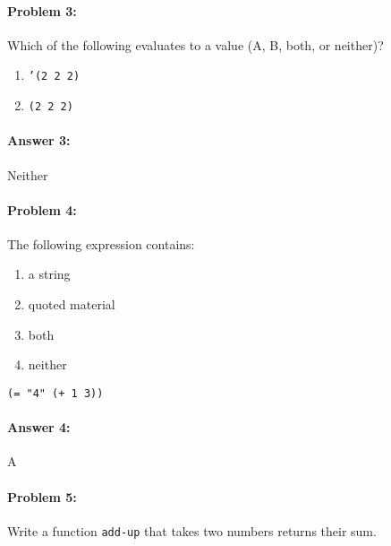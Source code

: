 \documentclass[10pt]{article}
\begin{document}
\noindent\hrulefill%

\paragraph{Problem 3:}
Which of the following evaluates to a value (A, B, both, or neither)?

\begin{enumerate}[nosep, label=\Alph*.]
  \item \texttt{'(2 2 2)}
  \item \texttt{(2 2 2)}
\end{enumerate}

\paragraph{Answer 3:} Neither 

\noindent\hrulefill%

\paragraph{Problem 4:}
The following expression contains:
\begin{enumerate}[nosep, label=\Alph*.]
  \item a string
  \item quoted material
  \item both
  \item neither
\end{enumerate}

\begin{lstlisting}
(= "4" (+ 1 3))
\end{lstlisting}

\paragraph{Answer 4:} A
\hfill

\noindent\hrulefill%

\paragraph{Problem 5:}
Write a function \texttt{add-up} that takes two numbers returns their sum.
\end{document}
